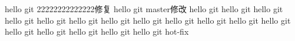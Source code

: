 hello git 22222222222222修复
hello git master修改
hello git
hello git
hello git
hello git
hello git
hello git
hello git
hello git
hello git
hello git
hello git
hello git
hello git
hello git
hello git
hello git
hello git hot-fix
